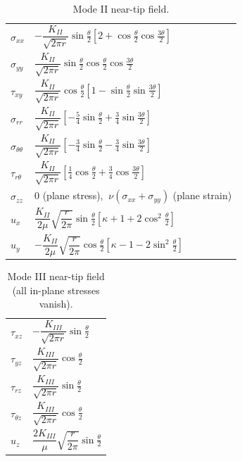 \documentclass[11pt,a4paper]{article}
\begin{document}
\begin{table}[!htbp]
\centering
\caption{Mode II near-tip field.}
\renewcommand{\arraystretch}{1.5}
\begin{tabular}{@{}ll@{}}
\toprule
$\sigma_{xx}$ & $-\dfrac{K_{II}}{\sqrt{2\pi r}}\sin\frac\theta2\left[2+\cos\frac\theta2\cos\frac{3\theta}2\right]$\\
$\sigma_{yy}$ & $\dfrac{K_{II}}{\sqrt{2\pi r}}\sin\frac\theta2\cos\frac\theta2\cos\frac{3\theta}2$\\
$\tau_{xy}$ & $\dfrac{K_{II}}{\sqrt{2\pi r}}\cos\frac\theta2\left[1-\sin\frac\theta2\sin\frac{3\theta}2\right]$\\
$\sigma_{rr}$ & $\dfrac{K_{II}}{\sqrt{2\pi r}}\left[-\frac54\sin\frac\theta2+\frac34\sin\frac{3\theta}2\right]$\\
$\sigma_{\theta\theta}$ & $\dfrac{K_{II}}{\sqrt{2\pi r}}\left[-\frac34\sin\frac\theta2-\frac34\sin\frac{3\theta}2\right]$\\
$\tau_{r\theta}$ & $\dfrac{K_{II}}{\sqrt{2\pi r}}\left[\frac14\cos\frac\theta2+\frac34\cos\frac{3\theta}2\right]$\\
$\sigma_{zz}$ & $0$ (plane stress), $\ \nu(\sigma_{xx}+\sigma_{yy})$ (plane strain)\\
$u_x$ & $\dfrac{K_{II}}{2\mu}\sqrt{\dfrac r{2\pi}}\sin\frac\theta2\left[\kappa+1+2\cos^2\frac\theta2\right]$\\
$u_y$ & $-\dfrac{K_{II}}{2\mu}\sqrt{\dfrac r{2\pi}}\cos\frac\theta2\left[\kappa-1-2\sin^2\frac\theta2\right]$\\
\bottomrule
\end{tabular}
\end{table}

\begin{table}[!htbp]
\centering
\caption{Mode III near-tip field (all in-plane stresses vanish).}
\renewcommand{\arraystretch}{1.5}
\begin{tabular}{@{}ll@{}}
\toprule
$\tau_{xz}$ & $-\dfrac{K_{III}}{\sqrt{2\pi r}}\sin\frac\theta2$\\
$\tau_{yz}$ & $\dfrac{K_{III}}{\sqrt{2\pi r}}\cos\frac\theta2$\\
$\tau_{rz}$ & $\dfrac{K_{III}}{\sqrt{2\pi r}}\sin\frac\theta2$\\
$\tau_{\theta z}$ & $\dfrac{K_{III}}{\sqrt{2\pi r}}\cos\frac\theta2$\\
$u_z$ & $\dfrac{2K_{III}}{\mu}\sqrt{\dfrac r{2\pi}}\sin\frac\theta2$\\
\bottomrule
\end{tabular}
\end{table}
\end{document}
